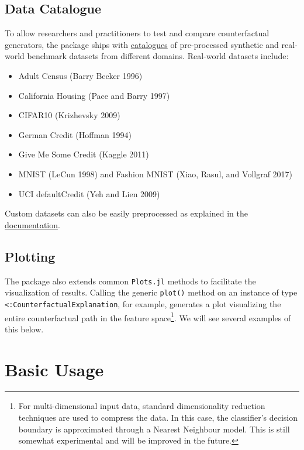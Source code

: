 \documentclass{juliacon}
\providecommand{\tightlist}{%
  \setlength{\itemsep}{0pt}\setlength{\parskip}{0pt}}\usepackage{longtable,booktabs,array}
\begin{document}
\subsection{Data Catalogue}\label{data-catalogue}

To allow researchers and practitioners to test and compare
counterfactual generators, the package ships with
\href{https://juliatrustworthyai.github.io/CounterfactualExplanations.jl/v0.1/tutorials/data_catalogue/}{catalogues}
of pre-processed synthetic and real-world benchmark datasets from
different domains. Real-world datasets include:

\begin{itemize}
\tightlist
\item
  Adult Census (Barry Becker 1996)
\item
  California Housing (Pace and Barry 1997)
\item
  CIFAR10 (Krizhevsky 2009)
\item
  German Credit (Hoffman 1994)
\item
  Give Me Some Credit (Kaggle 2011)
\item
  MNIST (LeCun 1998) and Fashion MNIST (Xiao, Rasul, and Vollgraf 2017)
\item
  UCI defaultCredit (Yeh and Lien 2009)
\end{itemize}

Custom datasets can also be easily preprocessed as explained in the
\href{https://juliatrustworthyai.github.io/CounterfactualExplanations.jl/v0.1/tutorials/data_preprocessing/}{documentation}.

\subsection{Plotting}\label{plotting}

The package also extends common \texttt{Plots.jl} methods to facilitate
the visualization of results. Calling the generic \texttt{plot()} method
on an instance of type \texttt{\textless{}:CounterfactualExplanation},
for example, generates a plot visualizing the entire counterfactual path
in the feature space\footnote{For multi-dimensional input data, standard
  dimensionality reduction techniques are used to compress the data. In
  this case, the classifier's decision boundary is approximated through
  a Nearest Neighbour model. This is still somewhat experimental and
  will be improved in the future.}. We will see several examples of this
below.

\section{Basic Usage}\label{sec-use}
\end{document}
